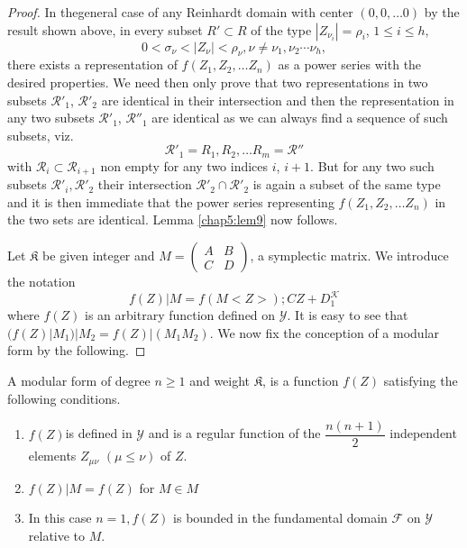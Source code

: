 \begin{proof}
In the\pageoriginale general case of any Reinhardt domain with center
$(0,0, \ldots 
0)$ by the result shown above, in every subset $R' \subset R$ of the
type $|Z_{\nu_i}|= \rho_i$, $ 1 \le i \le h$, 
$$
0< \sigma_\nu < |Z_\nu| < \rho_\nu ,\nu \neq \nu _1, \nu_2 \cdots \nu_h, 
$$ 
there exists a representation of $f(Z_1,Z_2, \ldots Z_n)$ as a power
series with the desired properties. We need then only prove that two
representations in two subsets $\mathcal{R'}_1$, $\mathcal{R'}_2$ are
identical in their intersection and then the representation in any two
subsets $\mathcal{R'}_1$, $\mathcal{R}''_1$ are identical as we can always
find a sequence of such subsets, viz. 
$$
\mathcal{R'}_1=R_1,R_2, \ldots R_m=\mathcal{R}'' 
$$
with $\mathcal{R}_i \subset \mathcal{R}_{i+1}$ non empty for any two
indices $i$, $i+1$. But 
for any two such subsets $\mathcal{R}'_i , \mathcal{R}'_2$ their
intersection 
$\mathcal{R'}_2 \cap \mathcal{R'}_2$ is again a subset of the same
type and it is then immediate that the power series representing
$f(Z_1,Z_2, \ldots Z_n)$ in the two sets are identical. Lemma
\ref{chap5:lem9} now follows. 

Let $\mathfrak{K}$ be given integer and $M= \begin{pmatrix} A&B
  \\C&D \end{pmatrix}$, a symplectic matrix. We introduce the
notation 
\begin{equation*}
f(Z)|M=f(M<Z>);CZ+D_1^{\mathcal{K}} \tag{92}\label{eq92}
\end{equation*}
where $f(Z)$ is an arbitrary function defined on $\mathscr{Y}$. It is
easy to see that $(f(Z)| M_1)|M_2=f(Z)|(M_1 M_2)$. We now fix the
conception of a modular form by the following. 
\end{proof}

\begin{defi*}
A modular form of degree $n \geq 1$ and weight $\mathfrak{K}$, is a 
function $f(Z)$ satisfying the following conditions.  
\begin{enumerate}[1)]
\item $f(Z)$\pageoriginale is defined in $\mathscr{Y}$ and is a
  regular function of   the $\dfrac{n(n+1)}{2}$ independent elements
  $Z_{\mu \nu}$  $(\mu \le   \nu)$ of $Z$.  

\item $f(Z)|M=f(Z)$ for $M\in M$

\item In this case $n=1,f(Z)$ is bounded in the fundamental domain
  $\mathcal{F}$ on $\mathscr{Y}$ relative to $M$.  
\end{enumerate}
\end{defi*}

